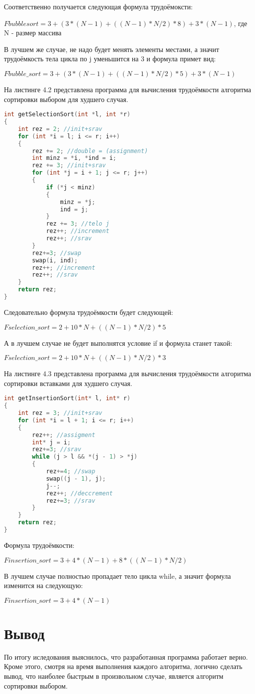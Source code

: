 Соответственно получается следующая формула трудоёмоксти:

$Fbubblesort = 3 + (3*(N-1) + ((N-1)*N/2)*8) + 3*(N-1)$, где N - размер массива

В лучшем же случае, не надо будет менять элементы местами, а значит трудоёмкость тела цикла по j уменьшится на 3 и формула примет вид:

$Fbubble\_sort = 3 + (3*(N-1) + ((N-1)*N/2)*5) + 3*(N-1)$

\newpage
На листинге 4.2 представлена программа для вычисления трудоёмкости алгоритма сортировки выбором для худшего случая.

\begin{lstlisting}[language=c++, caption=Вычисление трудоёмкости алгоритма сортировки выбором]
int getSelectionSort(int *l, int *r)
{
	int rez = 2; //init+srav
	for (int *i = l; i <= r; i++)
	{
		rez += 2; //double = (assignment)
		int minz = *i, *ind = i;
		rez += 3; //init+srav
		for (int *j = i + 1; j <= r; j++)
		{
			if (*j < minz)
			{
				minz = *j;
				ind = j;
			}
			rez += 3; //telo j
			rez++; //increment
			rez++; //srav
		}
		rez+=3; //swap
		swap(i, ind);
		rez++; //increment
		rez++; //srav
	}
	return rez;
}
\end{lstlisting}

Следовательно формула трудоёмкости будет следующей:

$Fselection\_sort = 2 + 10*N + ((N-1)*N/2)*5$

А в лучшем случае не будет выполнятся условие if и формула станет такой:

$Fselection\_sort = 2 + 10*N + ((N-1)*N/2)*3$

\newpage
На листинге 4.3 представлена программа для вычисления трудоёмкости алгоритма сортировки вставками для худшего случая.

\begin{lstlisting}[language=c++, caption=Вычисление трудоёмкости алгоритма сортировки вставками]
int getInsertionSort(int* l, int* r)
{
	int rez = 3; //init+srav
	for (int *i = l + 1; i <= r; i++)
	{
		rez++; //assigment
		int* j = i;
		rez+=3; //srav
		while (j > l && *(j - 1) > *j)
		{
			rez+=4; //swap
			swap((j - 1), j);
			j--;
			rez++; //deccrement
			rez+=3; //srav
		}
	}
	return rez;
}
\end{lstlisting}

Формула трудоёмкости:

$Finsertion\_sort = 3 + 4*(N-1) + 8*((N-1)*N/2)$

В лучшем случае полностью пропадает тело цикла while, а значит формула изменится на следующую:

$Finsertion\_sort = 3 + 4*(N-1)$

\section{Вывод}
По итогу иследования выяснилось, что разработанная программа работает верно. Кроме этого, смотря на время выполнения каждого алгоритма, логично сделать вывод, что наиболее быстрым в произвольном случае, является алгоритм сортировки выбором.